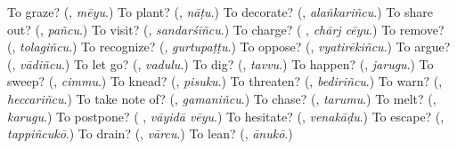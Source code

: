 \begin{tcolorbox}[breakable,colback=teal!4,colframe=teal!35!black,title={Before you move on}]
To graze? (\textbf{}, \emph{mēyu}.) To plant? (\textbf{}, \emph{nāṭu}.) To decorate? (\textbf{}, \emph{alaṅkariñcu}.) To share out? (\textbf{}, \emph{pañcu}.) To visit? (\textbf{}, \emph{sandarśiñcu}.) To charge? (\textbf{ }, \emph{chārj cēyu}.) To remove? (\textbf{}, \emph{tolagiñcu}.) To recognize? (\textbf{}, \emph{gurtupaṭṭu}.) To oppose? (\textbf{}, \emph{vyatirēkiñcu}.) To argue? (\textbf{}, \emph{vādiñcu}.) To let go? (\textbf{}, \emph{vadulu}.) To dig? (\textbf{}, \emph{tavvu}.) To happen? (\textbf{}, \emph{jarugu}.) To sweep? (\textbf{}, \emph{cimmu}.) To knead? (\textbf{}, \emph{pisuku}.) To threaten? (\textbf{}, \emph{bediriñcu}.) To warn? (\textbf{}, \emph{heccariñcu}.) To take note of? (\textbf{}, \emph{gamaniñcu}.) To chase? (\textbf{}, \emph{tarumu}.) To melt? (\textbf{}, \emph{karugu}.) To postpone? (\textbf{ }, \emph{vāyidā vēyu}.) To hesitate? (\textbf{}, \emph{venakāḍu}.) To escape? (\textbf{}, \emph{tappiñcukō}.) To drain? (\textbf{}, \emph{vārcu}.) To lean? (\textbf{}, \emph{ānukō}.)
\end{tcolorbox}
